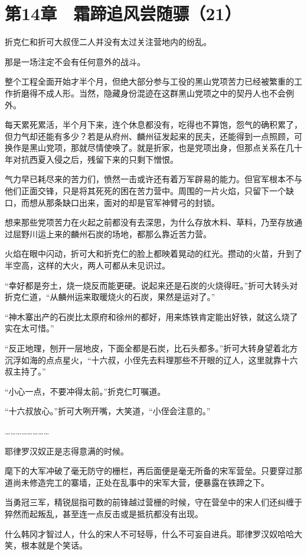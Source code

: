 \section{第14章　霜蹄追风尝随骠（21）}

折克仁和折可大叔侄二人并没有太过关注营地内的纷乱。

那是一场注定不会有任何意外的战斗。

整个工程全面开始才半个月，但绝大部分参与工役的黑山党项苦力已经被繁重的工作折磨得不成人形。当然，隐藏身份混迹在这群黑山党项之中的契丹人也不会例外。

每天累死累活，半个月下来，连个休息都没有，吃得也不算饱，怨气的确积累了，但力气却还能有多少？若是从府州、麟州征发起来的民夫，还能得到一点照顾，可换作是黑山党项，那就尽情使唤了。就是折家，也是党项出身，但那点关系在几十年对抗西夏入侵之后，残留下来的只剩下憎恨。

气力早已耗尽来的苦力们，愤然一击或许还有着万军辟易的能力。但官军根本不与他们正面交锋，只是将其死死的困在苦力营中。周围的一片火焰，只留下一个缺口，而想从那条缺口出来，面对的却是官军神臂弓的封锁。

想来那些党项苦力在火起之前都没有去深思，为什么存放木料、草料，乃至存放通过屈野川运上来的麟州石炭的场地，都那么靠近苦力营。

火焰在眼中闪动，折可大和折克仁的脸上都映着晃动的红光。攒动的火苗，升到了半空高，这样的大火，两人可都从未见识过。

“幸好都是夯土，烧一烧反而能更硬。说起来还是石炭的火烧得旺。”折可大转头对折克仁道，“从麟州运来取暖烧火的石炭，果然是运对了。”

“神木寨出产的石炭比太原府和徐州的都好，用来炼铁肯定能出好铁，就这么烧了实在太可惜。”

“反正地理，刨开一层地皮，下面全都是石炭，比石头都多。”折可大转身望着北方沉浮如海的点点星火，“十六叔，小侄先去料理那些不开眼的辽人，这里就靠十六叔主持了。”

“小心一点，不要冲得太前。”折克仁叮嘱道。

“十六叔放心。”折可大咧开嘴，大笑道，“小侄会注意的。”

……………………

耶律罗汉奴正是志得意满的时候。

麾下的大军冲破了毫无防守的栅栏，再后面便是毫无所备的宋军营垒。只要穿过那道尚未修造完工的寨墙，正处在乱事中的宋军大营，便暴露在铁蹄之下。

当勇冠三军，精锐屈指可数的前锋越过营栅的时候，守在营垒中的宋人们还纠缠于猝然而起叛乱，甚至连一点反击或是抵抗都没有出现。

什么韩冈才智过人，什么的宋人不可轻辱，什么不可妄自进兵。耶律罗汉奴哈哈大笑，根本就是个笑话。

